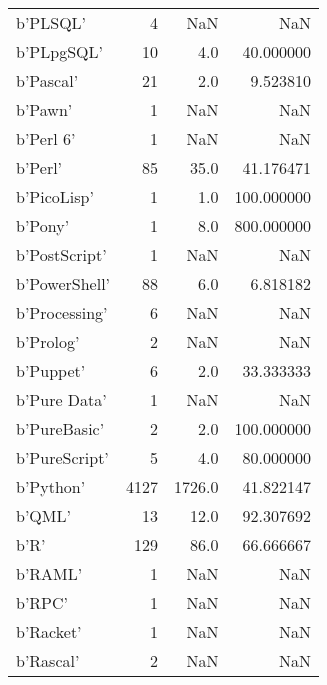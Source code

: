 \begin{table}
\begin{tabular}{lrrr}
b'PLSQL'                    &               4 &       NaN &            NaN \\
b'PLpgSQL'                  &              10 &       4.0 &      40.000000 \\
b'Pascal'                   &              21 &       2.0 &       9.523810 \\
b'Pawn'                     &               1 &       NaN &            NaN \\
b'Perl 6'                   &               1 &       NaN &            NaN \\
b'Perl'                     &              85 &      35.0 &      41.176471 \\
b'PicoLisp'                 &               1 &       1.0 &     100.000000 \\
b'Pony'                     &               1 &       8.0 &     800.000000 \\
b'PostScript'               &               1 &       NaN &            NaN \\
b'PowerShell'               &              88 &       6.0 &       6.818182 \\
b'Processing'               &               6 &       NaN &            NaN \\
b'Prolog'                   &               2 &       NaN &            NaN \\
b'Puppet'                   &               6 &       2.0 &      33.333333 \\
b'Pure Data'                &               1 &       NaN &            NaN \\
b'PureBasic'                &               2 &       2.0 &     100.000000 \\
b'PureScript'               &               5 &       4.0 &      80.000000 \\
b'Python'                   &            4127 &    1726.0 &      41.822147 \\
b'QML'                      &              13 &      12.0 &      92.307692 \\
b'R'                        &             129 &      86.0 &      66.666667 \\
b'RAML'                     &               1 &       NaN &            NaN \\
b'RPC'                      &               1 &       NaN &            NaN \\
b'Racket'                   &               1 &       NaN &            NaN \\
b'Rascal'                   &               2 &       NaN &            NaN \\

\end{tabular}
\end{table}
